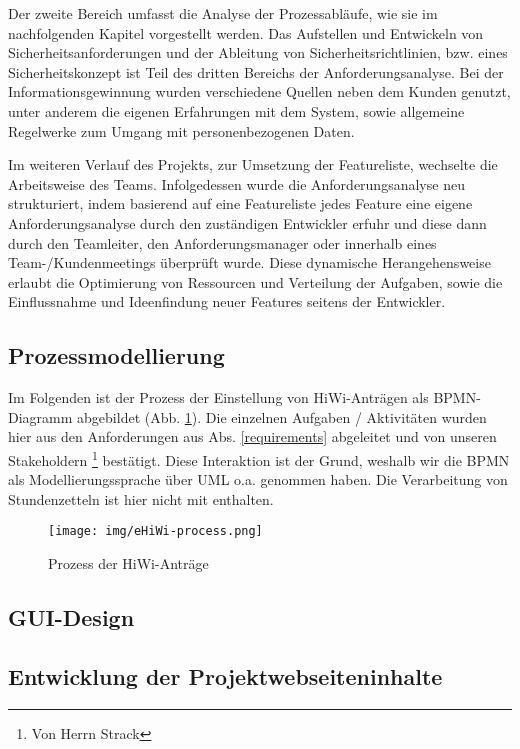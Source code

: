 \documentclass[12pt,a4paper]{scrartcl}
\begin{document}
Der zweite Bereich umfasst die Analyse der Prozessabläufe, wie sie im nachfolgenden Kapitel vorgestellt werden. Das Aufstellen und Entwickeln von Sicherheitsanforderungen und der Ableitung von Sicherheitsrichtlinien, bzw. eines Sicherheitskonzept ist Teil des dritten Bereichs der Anforderungsanalyse. Bei der Informationsgewinnung wurden verschiedene Quellen neben dem Kunden genutzt, unter anderem die eigenen Erfahrungen mit dem System, sowie allgemeine Regelwerke zum Umgang mit personenbezogenen Daten.

Im weiteren Verlauf des Projekts, zur Umsetzung der Featureliste, wechselte die Arbeitsweise des Teams. Infolgedessen wurde die Anforderungsanalyse neu strukturiert, indem basierend auf eine Featureliste jedes Feature eine eigene Anforderungsanalyse durch den zuständigen Entwickler erfuhr und diese dann durch den Teamleiter, den Anforderungsmanager oder innerhalb eines Team-/Kundenmeetings überprüft wurde. Diese dynamische Herangehensweise erlaubt die Optimierung von Ressourcen und Verteilung der Aufgaben, sowie die Einflussnahme und Ideenfindung neuer Features seitens der Entwickler. 

\subsection{Prozessmodellierung}
\label{processmodel}
Im Folgenden ist der Prozess der Einstellung von HiWi-Anträgen als BPMN-Diagramm abgebildet (Abb. \ref{fig:bpmn-process}).
Die einzelnen Aufgaben / Aktivitäten wurden hier aus den Anforderungen aus Abs. \ref{requirements} abgeleitet und von unseren Stakeholdern \footnote{Von Herrn Strack} bestätigt.
Diese Interaktion ist der Grund, weshalb wir die BPMN als Modellierungssprache über UML o.a. genommen haben.
Die Verarbeitung von Stundenzetteln ist hier nicht mit enthalten.

\begin{figure}[H]
	\centering
	\texttt{[image: img/eHiWi-process.png]}
	\caption{Prozess der HiWi-Anträge}
	\label{fig:bpmn-process}
\end{figure}

\subsection{GUI-Design}

\subsection{Entwicklung der Projektwebseiteninhalte}
\end{document}
